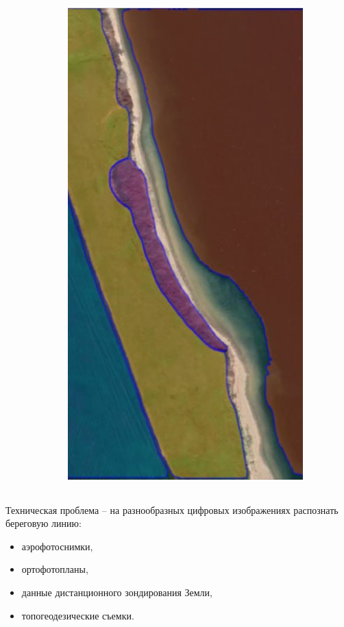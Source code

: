 \documentclass[10pt]{beamer}
\begin{document}
\begin{frame}
\begin{columns}
\begin{column}{0.25\linewidth}
    \end{column}
    \begin{column}{0.25\linewidth}
      \includegraphics[width=1\linewidth]{sa-source-ge.png}
    \end{column}
  \end{columns}
  Техническая проблема -- на разнообразных цифровых изображениях распознать береговую линию:
  \begin{itemize}
  \item аэрофотоснимки,
  \item ортофотопланы,
  \item данные дистанционного зондирования Земли,
  \item топогеодезические съемки.
  \end{itemize}
\end{frame}
\end{document}

